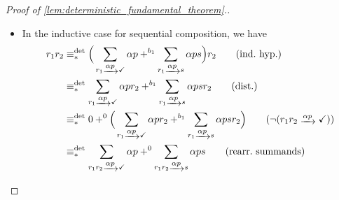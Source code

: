 \documentclass[orivec,envcountsect,envcountsame]{llncs}
\begin{document}
\begin{proof}[Proof of \cref{lem:deterministic_fundamental_theorem}.]
\begin{itemize}
\begin{align*}
			&\equiv_*^{\det}
			\Big(\sum_{r_1 \tr{\alpha  p} \checkmark} \alpha p
			+^{b_1\wedge c} \sum_{r_2 \tr{\alpha  p} \checkmark} \alpha p\Big)
			+^{b} \Big(\sum_{r_1 \tr{\alpha  p} s} \alpha p s
			+^{c\vee b_2} \sum_{r_2 \tr{\alpha  p} s} \alpha p s\Big)
			\tag{assoc.,\(\bullet\)}\\
			&\equiv_*^{\det} \sum_{r_1+ r_2 \tr{\alpha  p}\checkmark} \alpha p
			+^{b} \sum_{r_1 + r_2 \tr{\alpha  p} s} \alpha p s
		\end{align*}
		\(^\bullet\)In the last two steps, we define \(b = (b_1 \wedge c) \vee (\bar c \wedge b_2)\).
		The separation markers in the derivation above indicate how to construct each expression that appears as a deterministic expression.
		This establishes that there is a deterministic proof of \(r_1 + r_2 \equiv_* \sum_{r_1+ r_2 \tr{\alpha  p}\checkmark} \alpha p
+ \sum_{r_1 + r_2 \tr{\alpha  p} s} \alpha p s\).


		\item In the inductive case for sequential composition, we have
		\begin{align*}
			r_1r_2
			&\equiv_*^{\det}
			\Big(\sum_{r_1 \tr{\alpha  p} \checkmark} \alpha p
			+^{b_1} \sum_{r_1 \tr{\alpha  p} s} \alpha p s\Big)
			r_2 \tag{ind.~hyp.}\\
			&\equiv_*^{\det}
			\sum_{r_1 \tr{\alpha  p} \checkmark} \alpha p r_2
			+^{b_1} \sum_{r_1 \tr{\alpha  p} s} \alpha p sr_2
			\tag{dist.}\\
			&\equiv_*^{\det}
			0 +^{0}\Big(\sum_{r_1 \tr{\alpha  p} \checkmark} \alpha p r_2
			+^{b_1} \sum_{r_1 \tr{\alpha  p} s} \alpha p sr_2\Big)
			\tag{\(\neg(r_1r_2 \tr{\alpha  p} \checkmark)\)}\\
			&\equiv_*^{\det}
			\sum_{r_1r_2 \tr{\alpha  p}\checkmark} \alpha p
			+^{0} \sum_{r_1r_2 \tr{\alpha  p} s} \alpha p s
			\tag{rearr.~summands}
		\end{align*}


\end{itemize}
\end{proof}
\end{document}
